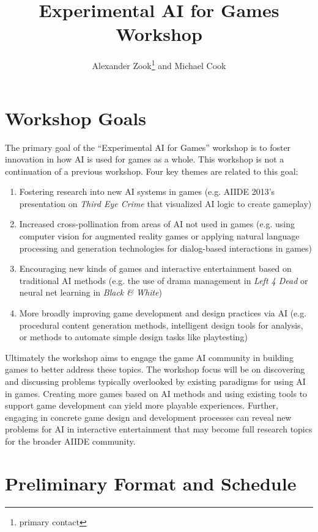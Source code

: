 \documentclass[10pt,a4paper]{article}
\author{Alexander Zook\footnote{primary contact} \hspace{1pt} and Michael Cook}
\title{Experimental AI for Games Workshop}
\date{}
\begin{document}
\maketitle

\section{Workshop Goals}

The primary goal of the ``Experimental AI for Games'' workshop is to foster innovation in how AI is used for games as a whole.
This workshop is not a continuation of a previous workshop.
Four key themes are related to this goal:
\begin{enumerate}
\item Fostering research into new AI systems in games (e.g. AIIDE 2013's presentation on \textit{Third Eye Crime} that visualized AI logic to create gameplay)
\item Increased cross-pollination from areas of AI not used in games (e.g. using computer vision for augmented reality games or applying natural language processing and generation technologies for dialog-based interactions in games)
\item Encouraging new kinds of games and interactive entertainment based on traditional AI methods (e.g. the use of drama management in \textit{Left 4 Dead} or neural net learning in \textit{Black \& White})
\item More broadly improving game development and design practices via AI (e.g. procedural content generation methods, intelligent design tools for analysis, or methods to automate simple design tasks like playtesting)
\end{enumerate}

Ultimately the workshop aims to engage the game AI community in building games to better address these topics.
The workshop focus will be on discovering and discussing problems typically overlooked by existing paradigms for using AI in games.
Creating more games based on AI methods and using existing tools to support game development can yield more playable experiences.
Further, engaging in concrete game design and development processes can reveal new problems for AI in interactive entertainment that may become full research topics for the broader AIIDE community.



\section{Preliminary Format and Schedule}
\end{document}
